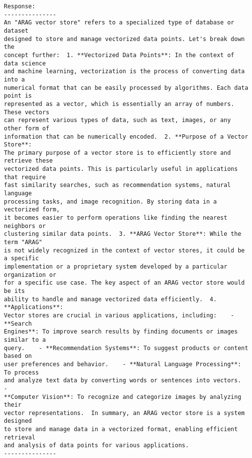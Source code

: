 \documentclass[11pt]{article}
\makeatletter
\newcommand{\boxspacing}{\kern\kvtcb@left@rule\kern\kvtcb@boxsep}
\newcommand{\prompt}[4]{
        {\ttfamily\llap{{\color{#2}[#3]:\hspace{3pt}#4}}\vspace{-\baselineskip}}
    }
\makeatother
\begin{document}
    \begin{Verbatim}[commandchars=\\\{\}]
Response:
---------------
An "ARAG vector store" refers to a specialized type of database or dataset
designed to store and manage vectorized data points. Let's break down the
concept further:  1. **Vectorized Data Points**: In the context of data science
and machine learning, vectorization is the process of converting data into a
numerical format that can be easily processed by algorithms. Each data point is
represented as a vector, which is essentially an array of numbers. These vectors
can represent various types of data, such as text, images, or any other form of
information that can be numerically encoded.  2. **Purpose of a Vector Store**:
The primary purpose of a vector store is to efficiently store and retrieve these
vectorized data points. This is particularly useful in applications that require
fast similarity searches, such as recommendation systems, natural language
processing tasks, and image recognition. By storing data in a vectorized form,
it becomes easier to perform operations like finding the nearest neighbors or
clustering similar data points.  3. **ARAG Vector Store**: While the term "ARAG"
is not widely recognized in the context of vector stores, it could be a specific
implementation or a proprietary system developed by a particular organization or
for a specific use case. The key aspect of an ARAG vector store would be its
ability to handle and manage vectorized data efficiently.  4. **Applications**:
Vector stores are crucial in various applications, including:    - **Search
Engines**: To improve search results by finding documents or images similar to a
query.    - **Recommendation Systems**: To suggest products or content based on
user preferences and behavior.    - **Natural Language Processing**: To process
and analyze text data by converting words or sentences into vectors.    -
**Computer Vision**: To recognize and categorize images by analyzing their
vector representations.  In summary, an ARAG vector store is a system designed
to store and manage data in a vectorized format, enabling efficient retrieval
and analysis of data points for various applications.
---------------

    \end{Verbatim}

    \begin{tcolorbox}[breakable, size=fbox, boxrule=1pt, pad at break*=1mm,colback=cellbackground, colframe=cellborder]
\prompt{In}{incolor}{ }{\boxspacing}
\begin{Verbatim}[commandchars=\\\{\}]

\end{Verbatim}
\end{tcolorbox}


    
    
    
\end{document}
